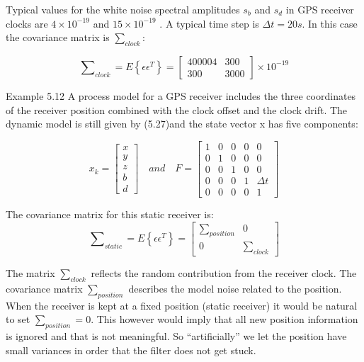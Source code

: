 	
	Typical values for the white noise spectral amplitudes $ s_{b} $ and $ s_{d} $ in GPS receiver clocks are $ 4\times10^{-19} $ and $ 15\times10^{-19} $ . A typical time step is $ \Delta t=20s $. In this case the covariance matrix is $ \sum\nolimits_{clock} $:
	
	\[ \sum\nolimits_{clock}=E\left\lbrace \epsilon \epsilon^{T} \right\rbrace =\begin{bmatrix}
	400004&300\\300&3000
	\end{bmatrix}\times10^{-19} \] 
	
	Example 5.12 A process model for a GPS receiver includes the three coordinates of the receiver position combined with the clock offset and the clock drift. The dynamic model is still given by (5.27)and the state vector x has five components:
	
	\[ x_{k}=\begin{bmatrix}
	x\\y\\z\\b\\d
	\end{bmatrix}\quad and \quad  F=\begin{bmatrix}
	1&0&0&0&0\\0&1&0&0&0\\0&0&1&0&0\\0&0&0&1&\Delta t\\0&0&0&0&1
	\end{bmatrix}  \]
 
	
	The covariance matrix for this static receiver is: 
	\begin{equation}\label{5.29}
	\sum\nolimits_{static} = E\left\lbrace \epsilon \epsilon^{T} \right\rbrace = \begin{bmatrix}
	\sum\nolimits_{position}&0\\0&\sum\nolimits_{clock}
	\end{bmatrix}
	\end{equation}
 
	
	The matrix $ \sum\nolimits_{clock} $ reflects the random contribution from the receiver clock. The covariance matrix $ \sum\nolimits_{position} $ describes the model noise related to the position. When the receiver is kept at a fixed position (static receiver) it would be natural to set $ \sum\nolimits_{position}=0$. This however would imply that all new position information is ignored and that is not meaningful. So “artificially” we let the position have small variances in order that the filter does not get stuck.
	
